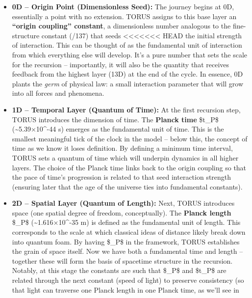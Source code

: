 \documentclass[]{article}
\begin{document}
\begin{itemize}
\item
  \textbf{0D -- Origin Point (Dimensionless Seed):} The journey begins
  at 0D, essentially a point with no extension. TORUS assigns to this
  base layer an \textbf{``origin coupling'' constant}, a dimensionless
  number analogous to the fine-structure constant (/137) that seeds
<<<<<<< HEAD
  the initial strength of interaction\hspace{0pt}. This can be thought
  of as the fundamental unit of interaction from which everything else
  will develop. It's a pure number that sets the scale for the recursion
  -- importantly, it will also be the quantity that receives feedback
  from the highest layer (13D) at the end of the cycle. In essence, 0D
  plants the \emph{germ} of physical law: a small interaction parameter
  that will grow into all forces and phenomena.
\item
  \textbf{1D -- Temporal Layer (Quantum of Time):} At the first
  recursion step, TORUS introduces the dimension of time. The
  \textbf{Planck time} \$t\_P\$ (\textasciitilde5.39×10\^{}-44 s)
  emerges as the fundamental unit of time\hspace{0pt}. This is the
  smallest meaningful tick of the clock in the model -- below this, the
  concept of time as we know it loses definition. By defining a minimum
  time interval, TORUS sets a quantum of time which will underpin
  dynamics in all higher layers. The choice of the Planck time links
  back to the origin coupling so that the pace of time's progression is
  related to that seed interaction strength (ensuring later that the age
  of the universe ties into fundamental constants).
\item
  \textbf{2D -- Spatial Layer (Quantum of Length):} Next, TORUS
  introduces space (one spatial degree of freedom, conceptually). The
  \textbf{Planck length} \$\ell\_P\$ (\textasciitilde1.616×10\^{}-35 m) is
  defined as the fundamental unit of length\hspace{0pt}. This
  corresponds to the scale at which classical ideas of distance likely
  break down into quantum foam. By having \$\ell\_P\$ in the framework,
  TORUS establishes the grain of space itself. Now we have both a
  fundamental time and length -- together these will form the basis of
  spacetime structure in the recursion. Notably, at this stage the
  constants are such that \$\ell\_P\$ and \$t\_P\$ are related through the
  next constant (speed of light) to preserve consistency (so that light
  can traverse one Planck length in one Planck time, as we'll see in

\end{itemize}
\end{document}
